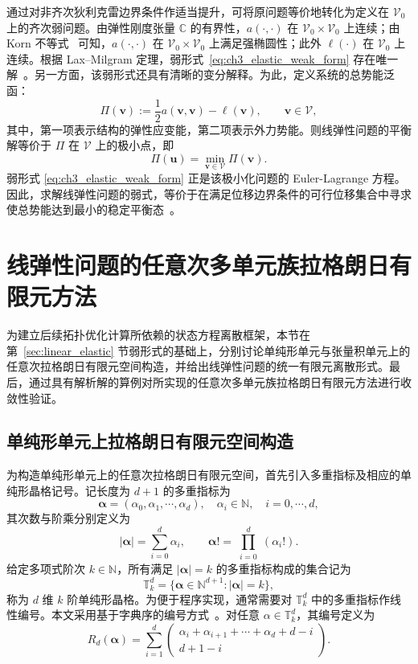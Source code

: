 通过对非齐次狄利克雷边界条件作适当提升，可将原问题等价地转化为定义在 $\mathcal{V}_0$ 上的齐次弱问题。由弹性刚度张量 $\mathbb{C}$ 的有界性，$a(\cdot,\cdot)$ 在 $\mathcal{V}_0\times\mathcal{V}_0$ 上连续；由 Korn 不等式~\cite{brennerMathematicalTheoryFinite2008} 可知，$a(\cdot,\cdot)$ 在 $\mathcal{V}_0\times\mathcal{V}_0$ 上满足强椭圆性；此外 $\ell(\cdot)$ 在 $\mathcal{V}_0$ 上连续。根据 Lax–Milgram 定理，弱形式~\eqref{eq:ch3_elastic_weak_form} 存在唯一解~\cite{ciarletFiniteElementMethod2002a}。另一方面，该弱形式还具有清晰的变分解释。为此，定义系统的总势能泛函：
\[
\Pi(\boldsymbol{v}) :=\frac{1}{2}a(\boldsymbol{v},\boldsymbol{v})-\ell(\boldsymbol{v}), \qquad \boldsymbol{v}\in\mathcal{V},
\]
其中，第一项表示结构的弹性应变能，第二项表示外力势能。则线弹性问题的平衡解等价于 $\Pi$ 在 $\mathcal{V}$ 上的极小点，即
\[
\Pi(\boldsymbol{u})=\min_{\boldsymbol{v}\in\mathcal{V}}\Pi(\boldsymbol{v}).
\]
弱形式 \eqref{eq:ch3_elastic_weak_form} 正是该极小化问题的 Euler-Lagrange 方程。因此，求解线弹性问题的弱式，等价于在满足位移边界条件的可行位移集合中寻求使总势能达到最小的稳定平衡态~\cite{zienkiewiczFiniteElementMethod2005}。


\section{线弹性问题的任意次多单元族拉格朗日有限元方法}
\label{sec:lagrange_fem}

为建立后续拓扑优化计算所依赖的状态方程离散框架，本节在第~\ref{sec:linear_elastic} 节弱形式的基础上，分别讨论单纯形单元与张量积单元上的任意次拉格朗日有限元空间构造，并给出线弹性问题的统一有限元离散形式。最后，通过具有解析解的算例对所实现的任意次多单元族拉格朗日有限元方法进行收敛性验证。


\subsection{单纯形单元上拉格朗日有限元空间构造}
\label{subsec:simplex_lagrange}

为构造单纯形单元上的任意次拉格朗日有限元空间，首先引入多重指标及相应的单纯形晶格记号。记长度为 $d+1$ 的多重指标为
\[
\boldsymbol{\alpha} = (\alpha_0,\alpha_1,\cdots,\alpha_d),\quad\alpha_i\in\mathbb{N},\quad{i}=0,\cdots,d,
\]
其次数与阶乘分别定义为
\[|\boldsymbol{\alpha}| = \sum_{i=0}^{d}\alpha_i,\qquad\boldsymbol{\alpha}! = \prod_{\substack{i=0}}^d(\alpha_i!).
\]
给定多项式阶次 $k\in\mathbb{N}$，所有满足 $|\boldsymbol{\alpha}| = k$ 的多重指标构成的集合记为
\[
\mathbb{T}_k^d = \{\boldsymbol{\alpha}\in\mathbb{N}^{d+1}:|\boldsymbol{\alpha}| = k\},
\]
称为 $d$ 维 $k$ 阶单纯形晶格。为便于程序实现，通常需要对 $\mathbb{T}_k^d$ 中的多重指标作线性编号。本文采用基于字典序的编号方式~\cite{chenGeometricDecompositionEfficient2024b}。对任意 $\alpha\in\mathbb{T}_k^d$，其编号定义为
\[
R_d(\boldsymbol{\alpha}) = \sum_{i=1}^d
\begin{pmatrix}
	\alpha_i+\alpha_{i+1}+\cdots+\alpha_d+d-i\\
	d+1-i
\end{pmatrix}.
\]

